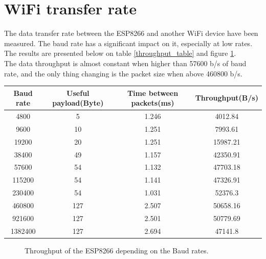 \documentclass[11pt]{article}
\begin{document}
\section{WiFi transfer rate}
The data transfer rate between the ESP8266 and another WiFi device have been measured. The baud rate has a significant impact on it, especially at low rates. The results are presented below on table \ref{throughput_table} and figure \ref{throughput_fig}.\\
The data throughput is almost constant when higher than 57600 b/s of baud rate, and the only thing changing is the packet size when above 460800 b/s.
\begin{center}
\label{throughput_table}
\begin{tabular}{|c|c|c|c|}
\hline
Baud rate & Useful payload(Byte) & Time between packets(ms) & Throughput(B/s)\\
\hline
4800 & 5 & 1.246 & 4012.84 \\
\hline
9600 & 10 & 1.251 & 7993.61 \\
\hline
19200 & 20 & 1.251 & 15987.21 \\
\hline
38400 & 49 & 1.157 & 42350.91 \\
\hline
57600 & 54 & 1.132 & 47703.18 \\
\hline
115200 & 54 & 1.141 & 47326.91 \\
\hline
230400 & 54 & 1.031 & 52376.3 \\
\hline
460800 & 127 & 2.507 & 50658.16 \\
\hline
921600 & 127 & 2.501 & 50779.69 \\
\hline
1382400 & 127 & 2.694 & 47141.8\\
\hline
\end{tabular}
\end{center}
\begin{figure}[H]
        \center
        \caption{Throughput of the ESP8266 depending on the Baud rates.}
        \label{throughput_fig}
\end{figure}
\end{document}
